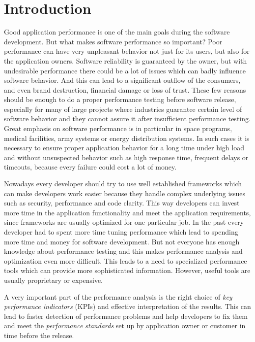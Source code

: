

\chapter{Introduction}
\label{Introduction}
Good application performance is one of the main goals during the software development. But what makes software performance so important? Poor performance can have very unpleasant behavior not just for its users, but also for the application owners. Software reliability is guaranteed by the owner, but with undesirable performance there could be a lot of issues which can badly influence software behavior. And this can lead to a significant outflow of the consumers, and even brand destruction, financial damage or loss of trust. These few reasons should be enough to do a proper performance testing before software release, especially for many of large projects where industries guarantee certain level of software behavior and they cannot assure it after insufficient performance testing. Great emphasis on software performance is in particular in space programs, medical facilities, army systems or energy distribution systems. In such cases it is necessary to ensure proper application behavior for a long time under high load and without unsuspected behavior such as high response time, frequent delays or timeouts, because every failure could cost a lot of money. 

Nowadays every developer should try to use well established  frameworks which can make developers work easier because they handle complex underlying issues such as security, performance and code clarity. This way developers can invest more time in the application functionality and meet the application requirements, since frameworks are usually optimized for one particular job. In the past every developer had to spent more time tuning performance which lead to spending more time and money for software development. But not everyone has enough knowledge about performance testing and this makes performance analysis and optimization even more difficult. This leads to a need to specialized performance tools which can provide more sophisticated information. However, useful tools are usually proprietary or expensive.

A very important part of the performance analysis is the right choice of \emph{key performance indicators} (KPIs) \cite{Molyneaux:TAoAPT} and effective interpretation of the results. This can lead to faster detection of performance problems and help developers to fix them and meet the \emph{performance standards} \cite{Molyneaux:TAoAPT} set up by application owner or customer in time before the release. 

